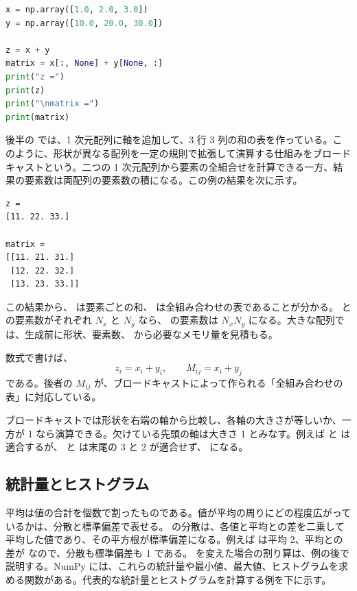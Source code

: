 \begin{lstlisting}[language=Python]
x = np.array([1.0, 2.0, 3.0])
y = np.array([10.0, 20.0, 30.0])

z = x + y
matrix = x[:, None] + y[None, :]
print("z =")
print(z)
print("\nmatrix =")
print(matrix)
\end{lstlisting}

後半の  では、1 次元配列に軸を追加して、3 行 3 列の和の表を作っている。このように、形状が異なる配列を一定の規則で拡張して演算する仕組みをブロードキャストという。二つの 1 次元配列から要素の全組合せを計算できる一方、結果の要素数は両配列の要素数の積になる。この例の結果を次に示す。

\begin{lstlisting}[numbers=none, xleftmargin=2\zw]
z =
[11. 22. 33.]

matrix =
[[11. 21. 31.]
 [12. 22. 32.]
 [13. 23. 33.]]
\end{lstlisting}

この結果から、 は要素ごとの和、 は全組み合わせの表であることが分かる。 と  の要素数がそれぞれ \(N_x\) と \(N_y\) なら、 の要素数は \(N_xN_y\) になる。大きな配列では、生成前に形状、要素数、 から必要なメモリ量を見積もる。

数式で書けば、
\[
z_i = x_i + y_i,\qquad
M_{ij} = x_i + y_j
\]
である。後者の \(M_{ij}\) が、ブロードキャストによって作られる「全組み合わせの表」に対応している。

ブロードキャストでは形状を右端の軸から比較し、各軸の大きさが等しいか、一方が 1 なら演算できる。欠けている先頭の軸は大きさ 1 とみなす。例えば  と  は適合するが、 と  は末尾の 3 と 2 が適合せず、 になる。

\subsection{統計量とヒストグラム}

平均は値の合計を個数で割ったものである。値が平均の周りにどの程度広がっているかは、分散と標準偏差で表せる。 の分散は、各値と平均との差を二乗して平均した値であり、その平方根が標準偏差になる。例えば \code{[1, 3]} は平均 2、平均との差が \code{[-1, 1]} なので、分散も標準偏差も 1 である。 を変えた場合の割り算は、例の後で説明する。NumPy には、これらの統計量や最小値、最大値、ヒストグラムを求める関数がある。代表的な統計量とヒストグラムを計算する例を下に示す。

